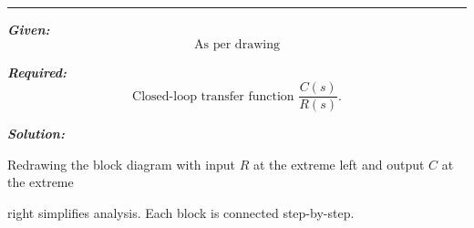 \documentclass[11pt]{article}
\begin{document}
\noindent\rule{\textwidth}{1pt}

\vspace{5pt}

\noindent\textbf{\textit{Given:}}  
\[
\text{As per drawing}
\]



\vspace{1em}
\noindent

\noindent\textbf{\textit{Required:}}  
\[
\text{Closed-loop transfer function } \frac{C(s)}{R(s)}.
\]

\vspace{1.5em}
\vspace{1.5em}
\noindent\textbf{\textit{Solution:}}  
\vspace{5pt}

Redrawing the block diagram with input $R$ at the extreme left and output $C$ at the extreme 

right simplifies analysis. Each block is connected step-by-step.
\end{document}
